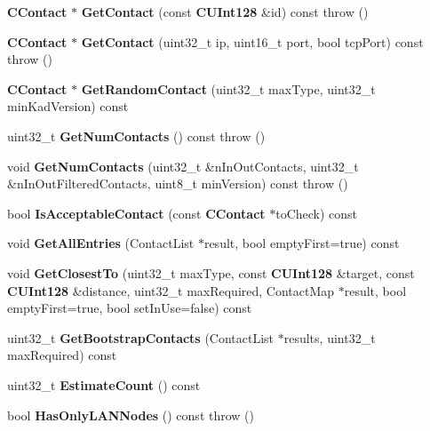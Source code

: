 \begin{DoxyCompactItemize}
\item 
{\bf CContact} $\ast$ {\bfseries GetContact} (const {\bf CUInt128} \&id) const   throw ()\label{classKademlia_1_1CRoutingZone_a8a1243cb338b28c699959ed962c4471d}

\item 
{\bf CContact} $\ast$ {\bfseries GetContact} (uint32\_\-t ip, uint16\_\-t port, bool tcpPort) const   throw ()\label{classKademlia_1_1CRoutingZone_a465650ab04d6993685f9be97a9af4c51}

\item 
{\bf CContact} $\ast$ {\bfseries GetRandomContact} (uint32\_\-t maxType, uint32\_\-t minKadVersion) const \label{classKademlia_1_1CRoutingZone_a60aed7911c171c62c910e058a9c7664c}

\item 
uint32\_\-t {\bfseries GetNumContacts} () const   throw ()\label{classKademlia_1_1CRoutingZone_a476a33273cd67999ed661321bb685c0a}

\item 
void {\bfseries GetNumContacts} (uint32\_\-t \&nInOutContacts, uint32\_\-t \&nInOutFilteredContacts, uint8\_\-t minVersion) const   throw ()\label{classKademlia_1_1CRoutingZone_a8dbb06560c9b97fede0dc2e31e7267fa}

\item 
bool {\bfseries IsAcceptableContact} (const {\bf CContact} $\ast$toCheck) const \label{classKademlia_1_1CRoutingZone_ae24791e6595293b1fe0259f783aece79}

\item 
void {\bfseries GetAllEntries} (ContactList $\ast$result, bool emptyFirst=true) const \label{classKademlia_1_1CRoutingZone_af0dc991cc81138d28b94c51ce5411ca9}

\item 
void {\bfseries GetClosestTo} (uint32\_\-t maxType, const {\bf CUInt128} \&target, const {\bf CUInt128} \&distance, uint32\_\-t maxRequired, ContactMap $\ast$result, bool emptyFirst=true, bool setInUse=false) const \label{classKademlia_1_1CRoutingZone_a3c91436af3019b29590ed53ca884410f}

\item 
uint32\_\-t {\bfseries GetBootstrapContacts} (ContactList $\ast$results, uint32\_\-t maxRequired) const \label{classKademlia_1_1CRoutingZone_a20d534cd306db7fee78dafa7680a9d76}

\item 
uint32\_\-t {\bfseries EstimateCount} () const \label{classKademlia_1_1CRoutingZone_afe9e1c212087575d78f092d9c366e702}

\item 
bool {\bfseries HasOnlyLANNodes} () const   throw ()\label{classKademlia_1_1CRoutingZone_a5debcac8e8e4e7c1fe5030a30818ece6}

\end{DoxyCompactItemize}
